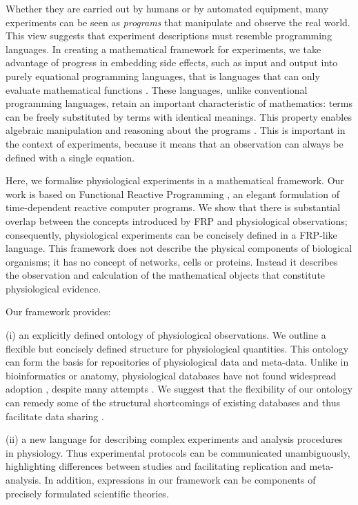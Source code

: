 Whether they are carried out by humans or by automated equipment, many
experiments can be seen as \emph{programs} that manipulate and observe
the real world. This view suggests that experiment descriptions must
resemble programming languages. In creating a mathematical framework
for experiments, we take advantage of progress in embedding side
effects, such as input and output \citep{PeytonJones2002, Roy2004,
  Wadler1995} into purely equational programming languages, that is
languages that can only evaluate mathematical functions
\citep{Church1941}. These languages, unlike conventional programming
languages, retain an important characteristic of mathematics: terms
can be freely substituted by terms with identical meanings. This
property \citep[referential transparency;][]{Whitehead1927} enables
algebraic manipulation and reasoning about the programs
\citep{Bird1996}. This is important in the context of experiments,
because it means that an observation can always be defined with a
single equation.

Here, we formalise physiological experiments in a mathematical
framework. Our work is based on Functional Reactive Programming
\citep[FRP;][]{Elliott1997, Nilsson2002}, an elegant formulation of
time-dependent reactive computer programs. We show that there is
substantial overlap between the concepts introduced by FRP and
physiological observations; consequently, physiological experiments
can be concisely defined in a FRP-like language. This framework does
not describe the physical components of biological organisms; it has no
concept of networks, cells or proteins. Instead it describes the
observation and calculation of the mathematical objects that
constitute physiological evidence.

Our framework provides:

(i) an explicitly defined ontology of physiological observations. We
outline a flexible but concisely defined structure for physiological
quantities. This ontology can form the basis for repositories of
physiological data and meta-data. Unlike in bioinformatics or anatomy,
physiological databases have not found widespread adoption
\citep{Herz2008, Amari2002}, despite many attempts \citep{Katz2010,
  Teeters2008, Gardner2004, Jessop2010}. We suggest that the
flexibility of our ontology can remedy some of the structural
shortcomings of existing databases \citep{Gardner2005, Amari2002} and
thus facilitate data sharing \citep{Insel2003}.

(ii) a new language for describing complex experiments and analysis
procedures in physiology. Thus experimental protocols can be
communicated unambiguously, highlighting differences between studies
and facilitating replication and meta-analysis. In addition,
expressions in our framework can be components of precisely
formulated scientific theories.

